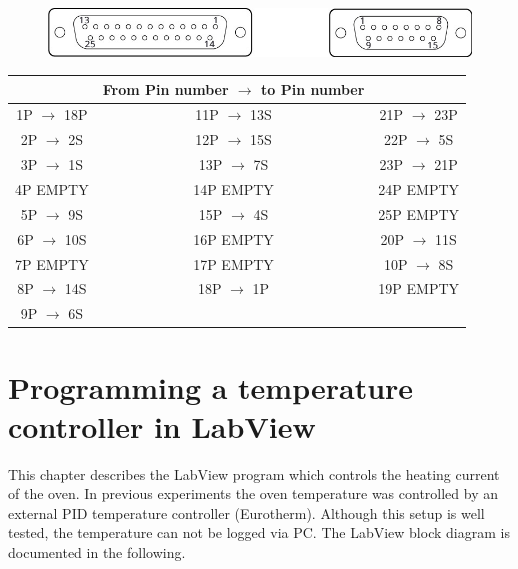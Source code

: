 \documentclass[parskip,12pt,headsepline,a4paper] {scrbook}
\begin{document}
\begin{figure}[ht]
\centerline{
\includegraphics[width=13cm]{./oven/DSub.jpg}}
\end{figure}
\begin{table}[h]
{}
\label{wireing}
\begin{center}
\begin{tabular}{c|c|c}
\multicolumn{1}{c}{} & \multicolumn{1}{c}{From Pin number $\rightarrow$ to Pin number} & \multicolumn{1}{c}{} \\
\hline
\rowcolor{hellgrau}
1P $\rightarrow$ 18P & 11P $\rightarrow$ 13S & 21P $\rightarrow$ 23P \\
\rowcolor{dunkelgrau}
2P $\rightarrow$ 2S & 12P $\rightarrow$ 15S & 22P $\rightarrow$ 5S \\
\rowcolor{hellgrau}
3P $\rightarrow$ 1S & 13P $\rightarrow$ 7S & 23P $\rightarrow$ 21P \\
\rowcolor{dunkelgrau}
4P EMPTY & 14P EMPTY & 24P EMPTY \\
\rowcolor{hellgrau}
5P $\rightarrow$ 9S & 15P $\rightarrow$ 4S & 25P EMPTY \\
\rowcolor{dunkelgrau}
6P $\rightarrow$ 10S & 16P EMPTY & 20P $\rightarrow$ 11S \\
\rowcolor{hellgrau}
7P EMPTY & 17P EMPTY & 10P $\rightarrow$ 8S \\
\rowcolor{dunkelgrau}
8P $\rightarrow$ 14S & 18P $\rightarrow$ 1P & 19P EMPTY \\
\rowcolor{hellgrau}
9P $\rightarrow$ 6S &  &  \\
\end{tabular}
\end{center}
\end{table}


\chapter{Programming a temperature controller in LabView}
\label{chap:tempprogram}
This chapter describes the LabView program which controls the heating current of the oven. In previous experiments the oven temperature was controlled by an external PID temperature controller (Eurotherm). Although this setup is well tested, the temperature can not be logged via PC. The LabView block diagram is documented in the following.
\end{document}
